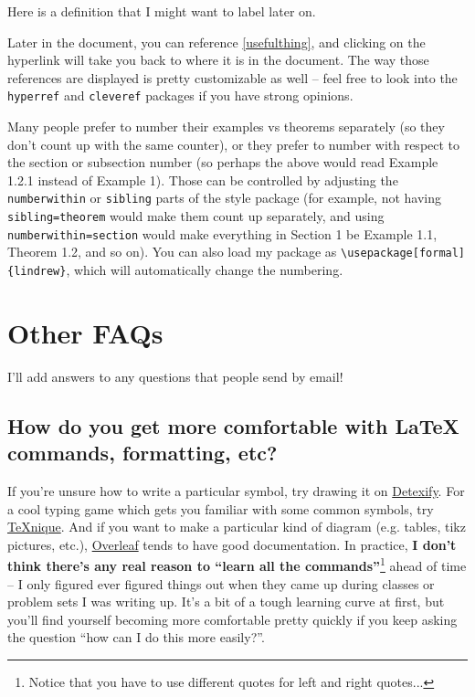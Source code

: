 \documentclass[11pt]{article}
\begin{document}
\begin{theorem}

\begin{definition}\label{usefulthing}
Here is a definition that I might want to label later on.
\end{definition}

Later in the document, you can reference \cref{usefulthing}, and clicking on the hyperlink will take you back to where it is in the document. The way those references are displayed is pretty customizable as well -- feel free to look into the \texttt{hyperref} and \texttt{cleveref} packages if you have strong opinions.

Many people prefer to number their examples vs theorems separately (so they don't count up with the same counter), or they prefer to number with respect to the section or subsection number (so perhaps the above would read Example 1.2.1 instead of Example 1). Those can be controlled by adjusting the \texttt{numberwithin} or \texttt{sibling} parts of the style package (for example, not having \texttt{sibling=theorem} would make them count up separately, and using \texttt{numberwithin=section} would make everything in Section 1 be Example 1.1, Theorem 1.2, and so on). You can also load my package as \texttt{\textbackslash usepackage[formal]\{lindrew\}}, which will automatically change the numbering.

\section{Other FAQs}

I'll add answers to any questions that people send by email! 

\subsection*{How do you get more comfortable with LaTeX commands, formatting, etc?}

If you're unsure how to write a particular symbol, try drawing it on \href{https://detexify.kirelabs.org/classify.html}{Detexify}. For a cool typing game which gets you familiar with some common symbols, try \href{https://texnique.xyz/}{TeXnique}. And if you want to make a particular kind of diagram (e.g. tables, tikz pictures, etc.), \href{https://www.overleaf.com/learn}{Overleaf} tends to have good documentation. In practice, \textbf{I don't think there's any real reason to ``learn all the commands''}\footnote{Notice that you have to use different quotes for left and right quotes...} ahead of time -- I only figured ever figured things out when they came up during classes or problem sets I was writing up. It's a bit of a tough learning curve at first, but you'll find yourself becoming more comfortable pretty quickly if you keep asking the question ``how can I do this more easily?''.


\end{theorem}
\end{document}

